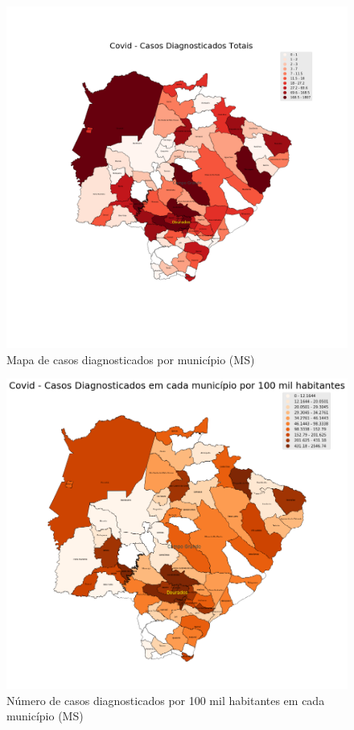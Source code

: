 \documentclass[12pt]{article}
\begin{document}
\begin{figure}[!htb]
  \centering
  \includegraphics[width=1\textwidth]{figs/mapa_casos_registrados.png}
  \caption{Mapa de casos diagnosticados por município (MS)}
  \label{fig:mapaCasos}
  \end{figure}


  \begin{figure}[!htb]
    \centering
    \includegraphics[width=1\textwidth]{figs/mapa_casos_100_mil.png}
    \caption{Número de casos diagnosticados por 100 mil habitantes em cada município (MS)}
    \label{fig:mapa100K}
    \end{figure}
  
\end{document}
